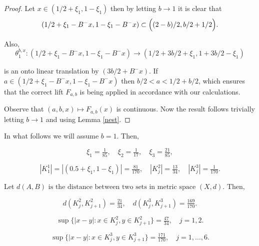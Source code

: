 \documentclass[12pt]{amsart}
\numberwithin{equation}{section}
\theoremstyle{remark}
\begin{document}
\begin{proof}
     Let $x \in (1/2+\xi_1,1-\xi_1)$ then by letting $b \to 1$ it is clear that
        \[
        (1/2+\xi_1-B^-x,1-\xi_1-B^-x) \subset \displaystyle\Bigl((2-b)/2,b/2+1/2\Bigr).
        \]

Also,
       \[
       \theta_1^{b,x}:  (1/2+\xi_1-B^-x,1-\xi_1-B^-x) \to  (1/2+3b/2+\xi_1,1+3b/2-\xi_1)
       \]
       
 \noindent    is an onto linear translation by $(3b/2+B^-x)$. If $a \in  (1/2+\xi_1-B^-x,1-\xi_1-B^-x) $ then  $b/2<a<1/2+b/2$, which ensures that the correct lift $F_{a,b}$ is being applied in accordance with our calculations.
 
Observe that $(a,b,x) \mapsto F_{a,b}(x)$ is continuous. Now the result follows trivially letting $b \to 1$ and using Lemma \ref{nest}.
\end{proof}    


In what follows we will assume $b=1$. Then, 




\[
\xi_1 = \tfrac{1}{85}, \quad \xi_2 = \tfrac{1}{17}, \quad \xi_3 = \tfrac{21}{85},
\]


\[
|K^1_{1}|=|(0.5+\xi_1,1-\xi_1)|=\tfrac{81}{170}, 
\quad |K^2_{j}|=\tfrac{13}{34}, 
\quad |K^3_{j}|=\tfrac{1}{170}.
\]
\vspace{.01cm}

Let $ d(A,B) \text{  is  the distance between two sets in metric space } (X,d)$. Then,  
 
\[
d(K^2_{j},K^2_{j+1})=\tfrac{21}{34}, 
\quad d(K^3_{j},K^3_{j+1})=\tfrac{169}{170}.
\]
 


\[
\sup\{|x-y|: x \in K^2_{j}, y \in K^2_{j+1}\} = \tfrac{47}{34}, \quad j=1,2.
\]

\[
\sup\{|x-y|: x \in K^3_{j}, y \in K^3_{j+1}\} = \tfrac{171}{170}, \quad j=1,\ldots,6.
\]
\end{document}
